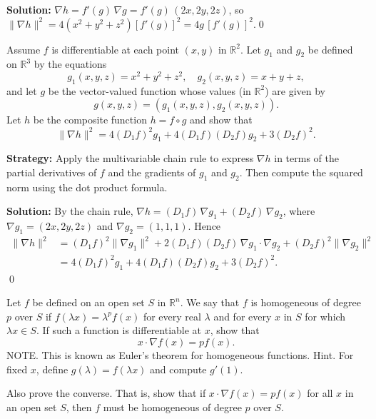 \bigskip\noindent\textbf{Solution:}
$\nabla h=f'(g)\,\nabla g=f'(g)\,(2x,2y,2z)$, so $\|\nabla h\|^2=4(x^2+y^2+z^2)[f'(g)]^2=4g\,[f'(g)]^2$.\qed


\begin{problembox}
Assume \( f \) is differentiable at each point \( (x, y) \) in \( \mathbb{R}^2 \). Let \( g_1 \) and \( g_2 \) be defined on \( \mathbb{R}^3 \) by the equations
\[g_1(x, y, z) = x^2 + y^2 + z^2, \quad g_2(x, y, z) = x + y + z,\]
and let \( g \) be the vector-valued function whose values (in \( \mathbb{R}^2 \)) are given by
\[g(x, y, z) = (g_1(x, y, z), g_2(x, y, z)).\]
Let \( h \) be the composite function \( h = f \circ g \) and show that
\[\| \nabla h \|^2 = 4(D_1f)^2g_1 + 4(D_1f)(D_2f)g_2 + 3(D_2f)^2.\]
\end{problembox}

\noindent\textbf{Strategy:} Apply the multivariable chain rule to express \( \nabla h \) in terms of the partial derivatives of \( f \) and the gradients of \( g_1 \) and \( g_2 \). Then compute the squared norm using the dot product formula.

\bigskip\noindent\textbf{Solution:}
By the chain rule, $\nabla h=(D_1 f)\,\nabla g_1+(D_2 f)\,\nabla g_2$, where $\nabla g_1=(2x,2y,2z)$ and $\nabla g_2=(1,1,1)$. Hence
\begin{align*}
\|\nabla h\|^2&=(D_1 f)^2\|\nabla g_1\|^2+2(D_1 f)(D_2 f)\,\nabla g_1\!\cdot\!\nabla g_2+(D_2 f)^2\|\nabla g_2\|^2\\
&=4(D_1 f)^2 g_1+4(D_1 f)(D_2 f) g_2+3(D_2 f)^2.
\end{align*}\qed


\begin{problembox}
Let \( f \) be defined on an open set \( S \) in \( \mathbb{R}^n \). We say that \( f \) is homogeneous of degree \( p \) over \( S \) if \( f(\lambda x) = \lambda^p f(x) \) for every real \( \lambda \) and for every \( x \) in \( S \) for which \( \lambda x \in S \). If such a function is differentiable at \( x \), show that
\[x \cdot \nabla f(x) = p f(x).\]
NOTE. This is known as Euler's theorem for homogeneous functions. Hint. For fixed \( x \), define \( g(\lambda) = f(\lambda x) \) and compute \( g'(1) \).

Also prove the converse. That is, show that if \( x \cdot \nabla f(x) = p f(x) \) for all \( x \) in an open set \( S \), then \( f \) must be homogeneous of degree \( p \) over \( S \).
\end{problembox}

